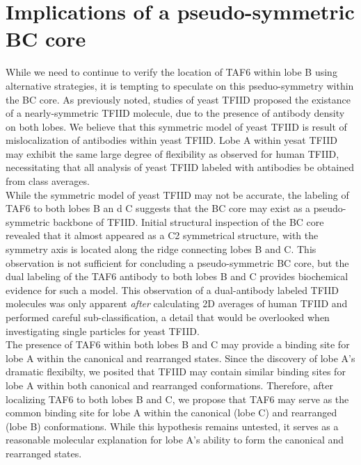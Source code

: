 \section{Implications of a pseudo-symmetric BC core}

\indent While we need to continue to verify the location of TAF6 within lobe B using alternative strategies, it is tempting to speculate on this pseduo-symmetry within the BC core. As previously noted, studies of yeast TFIID proposed the existance of a nearly-symmetric TFIID molecule, due to the presence of antibody density on both lobes. We believe that this symmetric model of yeast TFIID is result of mislocalization of antibodies within yeast TFIID. Lobe A within yesat TFIID may exhibit the same large degree of flexibility as observed for human TFIID, necessitating that all analysis of yeast TFIID labeled with antibodies be obtained from class averages. \\
\indent While the symmetric model of yeast TFIID may not be accurate, the labeling of TAF6 to both lobes B an d C suggests that the BC core may exist as a pseudo-symmetric backbone of TFIID. Initial structural inspection of the BC core revealed that it almost appeared as a C2 symmetrical structure, with the symmetry axis is located along the ridge connecting lobes B and C. This observation is not sufficient for concluding a pseudo-symmetric BC core, but the dual labeling of the TAF6 antibody to both lobes B and C provides biochemical evidence for such a model. This observation of a dual-antibody labeled TFIID molecules was only apparent \emph{after} calculating 2D averages of human TFIID and performed careful sub-classification, a detail that would be overlooked when investigating single particles for yeast TFIID.\\  
\indent The presence of TAF6 within both lobes B and C may provide a binding site for lobe A within the canonical and rearranged states. Since the discovery of lobe A's dramatic flexibilty, we posited that TFIID may contain similar binding sites for lobe A within both canonical and rearranged conformations. Therefore, after localizing TAF6 to both lobes B and C, we propose that TAF6 may serve as the common binding site for lobe A within the canonical (lobe C) and rearranged (lobe B) conformations. While this hypothesis remains untested, it serves as a reasonable molecular explanation for lobe A's ability to form the canonical and rearranged states.\\
